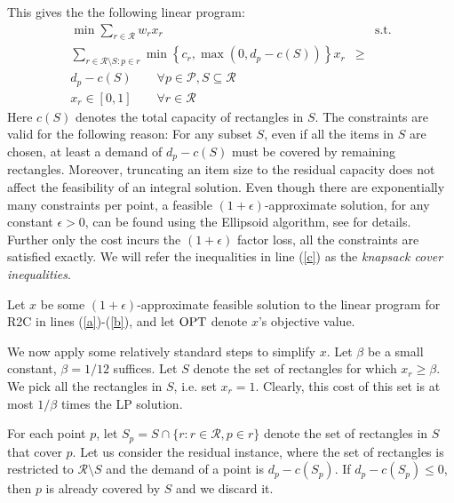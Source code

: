 \documentclass[11pt]{article}
\def \OPT  {\mbox{\rm OPT}}
\begin{document}
This gives the  the following linear program:
\begin{align}
\label{a} \min\sum_{r \in {\mathcal R}}  w_{r} x_{r} && \mbox{s.t.}\\
\label{c}\sum_{ r \in {\mathcal R}\setminus S: p \in r} 
\nonumber \min \left\{ c_r,  \max(0,d_p - c(S)) \right\} x_{r} &\ge& \\
d_p - c(S) \qquad \forall p\in {\mathcal P}, S \subseteq {\mathcal R} &&\\
\label{b} x_r  \in  [0,1]  \qquad \forall r \in {\mathcal R} && 
\end{align}
Here $c(S)$ denotes the total capacity of rectangles in $S$.
The constraints are valid for the following reason: For any subset $S$,  even if all the items in $S$ are chosen, at least a demand of $d_p -c(S)$ must be covered by remaining rectangles. 
Moreover, truncating an item size to the residual capacity does not affect the feasibility of an integral solution. Even though there are exponentially many constraints per point, 
a feasible $(1+\epsilon)$-approximate solution, for any constant $\epsilon>0$, can be found using the Ellipsoid algorithm, see
\cite{CarrFLP00} for details. Further 
only the cost incurs the $(1+\epsilon)$ factor loss, 
all the constraints are satisfied exactly.
We will refer the inequalities in line (\ref{c}) 
as the {\em knapsack cover inequalities}.



Let $x$ be some $(1+\epsilon)$-approximate feasible solution to the linear
program for R2C in lines (\ref{a})-(\ref{b}), 
and let $\OPT$ denote $x$'s objective value. 


We now apply some relatively standard steps to simplify $x$.
Let $\beta$ be  a small constant, $ \beta = 1/12$ suffices. 
Let $S$ denote the set of rectangles for which $x_r\geq \beta$. 
We pick all the rectangles in $S$, i.e. set $x_r=1$. Clearly, this cost of this set is at most $1/\beta$ times the LP solution.

For each point $p$, let $S_p = S \cap \{r: r \in {\mathcal R},p \in r\}$ denote the set of rectangles in $S$ that cover $p$. Let us consider the residual instance, where the set of rectangles is restricted to ${\mathcal R} \setminus S$ 
and the demand of a point is $d_p - c(S_p)$. If $d_p-c(S_p) \leq 0$, then $p$ is already covered by $S$ and we discard it.
\end{document}
